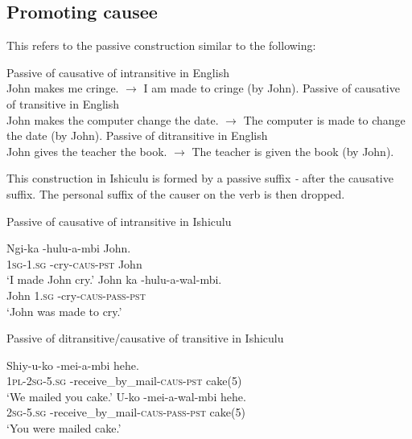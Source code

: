 \documentclass[12pt, oneside]{article}
\let\ipa\textipa
\begin{document}
\subsection{Promoting causee}

This refers to the passive construction similar to the following:

\begin{exe}
\ex Passive of causative of intransitive in English \\
John makes me cringe. $\rightarrow$ I am made to cringe (by John).
\ex Passive of causative of transitive in English \\
John makes the computer change the date. $\rightarrow$ The computer is made to change the date (by John).
\ex Passive of ditransitive in English \\
John gives the teacher the book. $\rightarrow$ The teacher is given the book (by John).
\end{exe}

This construction in Ishiculu is formed by a passive suffix \textit{-\ipa{wal7}} after the causative suffix. The personal suffix of the causer on the verb is then dropped.

\begin{exe}
\ex Passive of causative of intransitive in Ishiculu
\begin{xlist}
\ex
\gll Ngi-ka -hulu-\textbeltl a-mbi John. \\
\textsc{1sg}-\textsc{1.sg} -cry-\textsc{caus}-\textsc{pst} John \\
\trans `I made John cry.'
\ex
\gll John ka -hulu-\textbeltl a-wal\textramshorns-mbi. \\
John \textsc{1.sg} -cry-\textsc{caus}-\textsc{pass}-\textsc{pst} \\
\trans `John was made to cry.'
\end{xlist}
\ex Passive of ditransitive/causative of transitive in Ishiculu
\begin{xlist}
\ex
\gll Shiy-u-ko -me\textbeltl i-\textbeltl a-mbi hehe. \\
\textsc{1pl}-\textsc{2sg}-\textsc{5.sg} -receive\_by\_mail-\textsc{caus}-\textsc{pst} cake(5) \\
\trans `We mailed you cake.'
\ex
\gll U-ko -me\textbeltl i-\textbeltl a-wal\textramshorns-mbi hehe. \\
\textsc{2sg}-\textsc{5.sg} -receive\_by\_mail-\textsc{caus}-\textsc{pass}-\textsc{pst} cake(5) \\
\trans `You were mailed cake.'
\end{xlist}
\end{exe}
\end{document}
